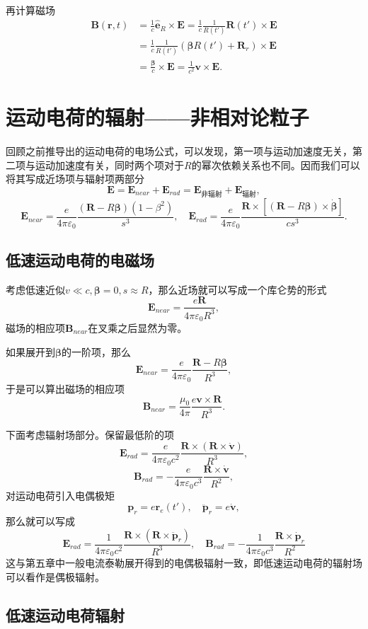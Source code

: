 \documentclass[UTF8]{ctexbook}
\renewcommand{\b}{\boldsymbol}
\numberwithin{equation}{chapter}
\begin{document}
	再计算磁场
	\begin{align*}
		\b{B}(\b{r},t)&=\frac{1}{c}\hat{\b{e}}_R\times\b{E}=\frac{1}{c}\frac{1}{R(t')}\b{R}(t')\times\b{E} \\
		&=\frac{1}{c}\frac{1}{R(t')}(\b{\beta}R(t')+\b{R}_r)\times\b{E} \\
		&=\frac{\b{\beta}}{c}\times\b{E}=\frac{1}{c^2}\b{v}\times\b{E}.
	\end{align*}
	
	\section{运动电荷的辐射——非相对论粒子}
	
	回顾之前推导出的运动电荷的电场公式，可以发现，第一项与运动加速度无关，第二项与运动加速度有关，同时两个项对于$R$的幂次依赖关系也不同。因而我们可以将其写成近场项与辐射项两部分
	\[\b{E}=\b{E}_{near}+\b{E}_{rad}=\b{E}_{\text{非辐射}}+\b{E}_{\text{辐射}},\]
	\[\b{E}_{near}=\frac{e}{4\pi\varepsilon_0}\frac{(\b{R}-R\b{\beta})(1-\beta^2)}{s^3},\quad \b{E}_{rad}=\frac{e}{4\pi\varepsilon_0}\frac{\b{R}\times \left[(\b{R}-R\b{\beta})\times\dot{\b{\beta}}\right]}{cs^3}.\]
	
	\subsection{低速运动电荷的电磁场}
	
	考虑低速近似$v\ll c,\b{\beta}=0,s\approx R$，那么近场就可以写成一个库仑势的形式
	\[\b{E}_{near}=\frac{e\b{R}}{4\pi\varepsilon_0 R^3},\]
	磁场的相应项$\b{B}_{near}$在叉乘之后显然为零。
	
	如果展开到$\b{\beta}$的一阶项，那么
	\[\b{E}_{near}=\frac{e}{4\pi\varepsilon_0}\frac{\b{R}-R\b{\beta}}{R^3},\]
	于是可以算出磁场的相应项
	\[\b{B}_{near}=\frac{\mu_0}{4\pi}\frac{e\b{v}\times\b{R}}{R^3}.\]
	
	下面考虑辐射场部分。保留最低阶的项
	\[\b{E}_{rad}=\frac{e}{4\pi\varepsilon_0c^2}\frac{\b{R}\times(\b{R}\times\dot{\b{v}})}{R^3},\]
	\[\b{B}_{rad}=-\frac{e}{4\pi\varepsilon_0c^3}\frac{\b{R}\times\dot{\b{v}}}{R^2},\]
	对运动电荷引入电偶极矩
	\[\b{p}_r=e\b{r}_e(t'),\quad \ddot{\b{p}}_r=e\dot{\b{v}},\]
	那么就可以写成
	\[\b{E}_{rad}=\frac{1}{4\pi\varepsilon_0 c^2}\frac{\b{R}\times(\b{R}\times\ddot{\b{p}}_r)}{R^3},\quad \b{B}_{rad}=-\frac{1}{4\pi\varepsilon_0c^3}\frac{\b{R}\times\dot{\b{p}}_r}{R^2}\]
	这与第五章中一般电流泰勒展开得到的电偶极辐射一致，即低速运动电荷的辐射场可以看作是偶极辐射。
	
	\subsection{低速运动电荷辐射}
	
\end{document}
